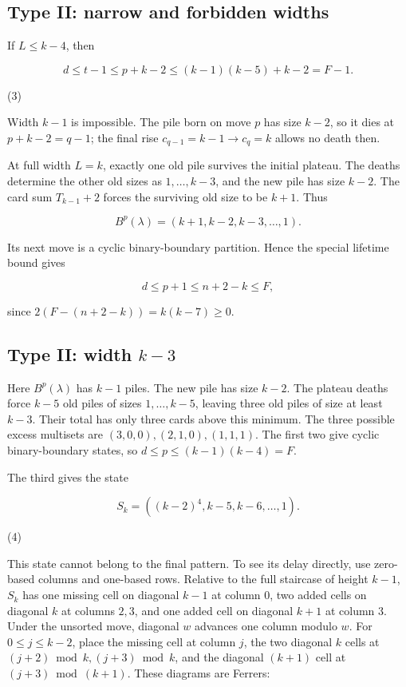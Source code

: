 \documentclass[11pt,a4paper]{article}
\begin{document}
\subsection{Type II: narrow and forbidden widths}

If $L\le k-4$, then

\[
d\le t-1\le p+k-2\le(k-1)(k-5)+k-2=F-1.
\]

(3)

Width $k-1$ is impossible. The pile born on move $p$ has size $k-2$, so it dies at $p+k-2=q-1$; the final rise $c_{q-1}=k-1\to c_q=k$ allows no death then.

At full width $L=k$, exactly one old pile survives the initial plateau. The deaths determine the other old sizes as $1,\ldots,k-3$, and the new pile has size $k-2$. The card sum $T_{k-1}+2$ forces the surviving old size to be $k+1$. Thus

\[
B^p(\lambda)=(k+1,k-2,k-3,\ldots,1).
\]

Its next move is a cyclic binary-boundary partition. Hence the special lifetime bound gives

\[
d\le p+1\le n+2-k\le F,
\]

since $2(F-(n+2-k))=k(k-7)\ge0$.

\subsection{Type II: width $k-3$}

Here $B^p(\lambda)$ has $k-1$ piles. The new pile has size $k-2$. The plateau deaths force $k-5$ old piles of sizes $1,\ldots,k-5$, leaving three old piles of size at least $k-3$. Their total has only three cards above this minimum. The three possible excess multisets are $(3,0,0),(2,1,0),(1,1,1)$. The first two give cyclic binary-boundary states, so $d\le p\le(k-1)(k-4)=F$.

The third gives the state

\[
S_k=((k-2)^4,k-5,k-6,\ldots,1).
\]

(4)

This state cannot belong to the final pattern. To see its delay directly, use zero-based columns and one-based rows. Relative to the full staircase of height $k-1$, $S_k$ has one missing cell on diagonal $k-1$ at column $0$, two added cells on diagonal $k$ at columns $2,3$, and one added cell on diagonal $k+1$ at column $3$. Under the unsorted move, diagonal $w$ advances one column modulo $w$. For $0\le j\le k-2$, place the missing cell at column $j$, the two diagonal $k$ cells at $(j+2)\bmod k,(j+3)\bmod k$, and the diagonal $(k+1)$ cell at $(j+3)\bmod(k+1)$. These diagrams are Ferrers:
\end{document}
